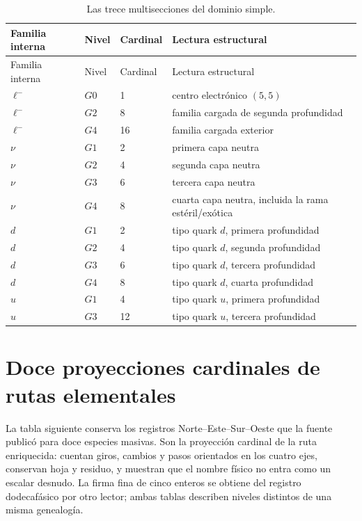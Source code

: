 \begin{longtable}{@{}L{0.22\textwidth}L{0.12\textwidth}L{0.12\textwidth}L{0.46\textwidth}@{}}
\caption{Las trece multisecciones del dominio simple.}
\label{tab:trece-multisecciones-catalogo-rev6}\\
\toprule
Familia interna & Nivel & Cardinal & Lectura estructural\\
\midrule
\endfirsthead
\toprule
Familia interna & Nivel & Cardinal & Lectura estructural\\
\midrule
\endhead
\(\ell^-\)&\(G0\)&1&centro electrónico \((5,5)\)\\
\(\ell^-\)&\(G2\)&8&familia cargada de segunda profundidad\\
\(\ell^-\)&\(G4\)&16&familia cargada exterior\\
\(\nu\)&\(G1\)&2&primera capa neutra\\
\(\nu\)&\(G2\)&4&segunda capa neutra\\
\(\nu\)&\(G3\)&6&tercera capa neutra\\
\(\nu\)&\(G4\)&8&cuarta capa neutra, incluida la rama estéril/exótica\\
\(d\)&\(G1\)&2&tipo quark \(d\), primera profundidad\\
\(d\)&\(G2\)&4&tipo quark \(d\), segunda profundidad\\
\(d\)&\(G3\)&6&tipo quark \(d\), tercera profundidad\\
\(d\)&\(G4\)&8&tipo quark \(d\), cuarta profundidad\\
\(u\)&\(G1\)&4&tipo quark \(u\), primera profundidad\\
\(u\)&\(G3\)&12&tipo quark \(u\), tercera profundidad\\
\bottomrule
\end{longtable}

\iffalse
\section{Doce proyecciones cardinales de rutas elementales}

La tabla siguiente conserva los registros Norte--Este--Sur--Oeste que la
fuente publicó para doce especies masivas. Son la proyección cardinal de la
ruta enriquecida: cuentan giros, cambios y pasos orientados en los cuatro
ejes, conservan hoja y residuo, y muestran que el nombre físico no entra como
un escalar desnudo. La firma fina de cinco enteros se obtiene del registro
dodecafásico por otro lector; ambas tablas describen niveles distintos de una
misma genealogía.

